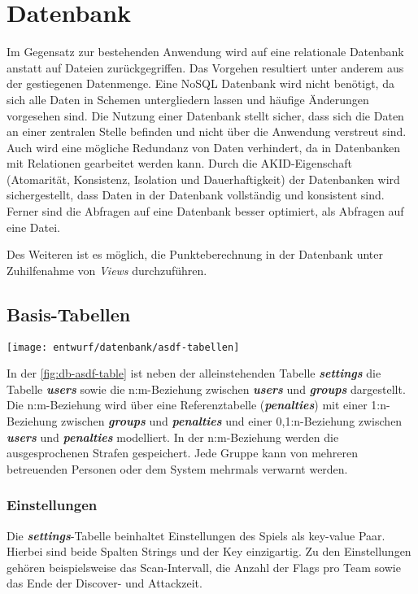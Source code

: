 \section{Datenbank}
\label{sec:Entwurf-Datenbank}
Im Gegensatz zur bestehenden Anwendung wird auf eine relationale Datenbank anstatt auf Dateien zurückgegriffen. Das Vorgehen resultiert unter anderem aus der gestiegenen Datenmenge. Eine NoSQL Datenbank wird nicht benötigt, da sich alle Daten in Schemen untergliedern lassen und häufige Änderungen vorgesehen sind. Die Nutzung einer Datenbank stellt sicher, dass sich die Daten an einer zentralen Stelle befinden und nicht über die Anwendung verstreut sind. Auch wird eine mögliche Redundanz von Daten verhindert, da in Datenbanken mit Relationen gearbeitet werden kann. Durch die AKID-Eigenschaft (Atomarität, Konsistenz, Isolation und Dauerhaftigkeit) der Datenbanken wird sichergestellt, dass Daten in der Datenbank vollständig und konsistent sind. Ferner sind die Abfragen auf eine Datenbank besser optimiert, als Abfragen auf eine Datei. \cite{drillingWasIstDatenbank2017}

Des Weiteren ist es möglich, die Punkteberechnung in der Datenbank unter Zuhilfenahme von \textit{Views} durchzuführen.

\subsection{Basis-Tabellen}
\begin{center}
	\texttt{[image: entwurf/datenbank/asdf-tabellen]}
	\label{fig:db-asdf-table}
\end{center}

In der \autoref{fig:db-asdf-table} ist neben der alleinstehenden Tabelle \textbf{\textit{settings}} die Tabelle \textbf{\textit{users}} sowie die n:m-Beziehung  zwischen \textbf{\textit{users}} und \textbf{\textit{groups}} dargestellt. Die  n:m-Beziehung wird über eine Referenztabelle (\textbf{\textit{penalties}}) mit einer 1:n-Beziehung zwischen \textbf{\textit{groups}} und \textbf{\textit{penalties}} und einer 0,1:n-Beziehung zwischen \textbf{\textit{users}} und \textbf{\textit{penalties}} modelliert. In der n:m-Beziehung werden die ausgesprochenen Strafen gespeichert. Jede Gruppe kann von mehreren betreuenden Personen oder dem System mehrmals verwarnt werden.

\subsubsection{Einstellungen}
Die \textbf{\textit{settings}}-Tabelle beinhaltet Einstellungen des Spiels als key-value Paar. Hierbei sind beide Spalten Strings und der Key einzigartig. Zu den Einstellungen gehören beispielsweise das Scan-Intervall, die Anzahl der Flags pro Team sowie das Ende der Discover- und Attackzeit.

